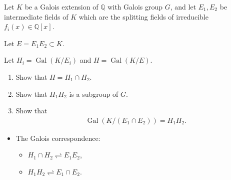 Let \(K\) be a Galois extension of \({\mathbb{Q}}\) with Galois group
\(G\), and let \(E_1 , E_2\) be intermediate fields of \(K\) which are
the splitting fields of irreducible \(f_i (x) \in {\mathbb{Q}}[x]\).

Let \(E = E_1 E_2 \subset K\).

Let \(H_i = \operatorname{Gal}(K/E_i)\) and
\(H = \operatorname{Gal}(K/E)\).

\begin{enumerate}
\def\labelenumi{\alph{enumi}.}
\item
  Show that \(H = H_1 \cap H_2\).
\item
  Show that \(H_1 H_2\) is a subgroup of \(G\).
\item
  Show that
  \begin{align*}
  \operatorname{Gal}(K/(E_1 \cap E_2 )) = H_1 H_2
  .\end{align*}
\end{enumerate}

\begin{concept}

\envlist

\begin{itemize}
\tightlist
\item
  The Galois correspondence:

  \begin{itemize}
  \tightlist
  \item
    \(H_1 \cap H_2 \rightleftharpoons E_1 E_2\),
  \item
    \(H_1 H_2 \rightleftharpoons E_1 \cap E_2\).
  \end{itemize}
\end{itemize}

\end{concept}

